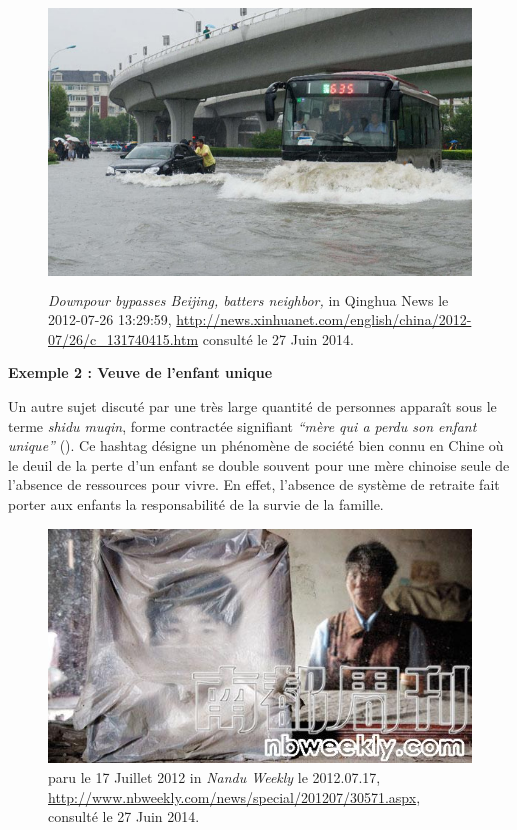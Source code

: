 \begin{figure}[h!]
    \centering
    \includegraphics[width=4.76in,height=3in]{figures/chap3/chapitre3-img16.jpg}
    \caption[Photo de Tianjin durant la pluie torentielle en Juillet 2012]{\textit{Downpour bypasses Beijing, batters neighbor, }in Qinghua News le 2012-07-26 13:29:59, \url{http://news.xinhuanet.com/english/china/2012-07/26/c_131740415.htm} consulté le 27 Juin 2014.}
\end{figure}

\textbf{Exemple 2 : Veuve de l{\textquoteright}enfant unique}

Un autre sujet discuté par une très large quantité de personnes appara\^it sous le terme {\textquotedbl}\textit{shidu muqin}{\textquotedbl}, forme contractée signifiant \textit{{\textquotedblleft}mère qui a perdu son enfant unique{\textquotedblright}} (). Ce hashtag désigne un phénomène de société bien connu en Chine o\`u le deuil de la perte d{\textquoteright}un enfant se double souvent pour une mère chinoise seule de l{\textquoteright}absence de ressources pour vivre. En effet, l{\textquoteright}absence de système de retraite fait porter aux enfants la responsabilité de la survie de la famille.

\begin{figure}[h!]
    \centering
    \includegraphics[scale=0.7]{figures/chap3/chapitre3-shidumuqin.jpg}
    \caption[Photo illustrative de Shidu Muqin]{ paru le 17 Juillet 2012 in \textit{Nandu Weekly} le 2012.07.17, \url{http://www.nbweekly.com/news/special/201207/30571.aspx}, consulté le 27 Juin 2014.}
    \label{fig:photo-shidumuqin}
\end{figure}


